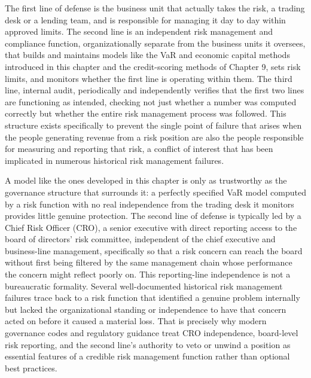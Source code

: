 \documentclass[../ai_in_finance]{subfiles}
\begin{document}
The first line of defense is the business unit that actually takes the risk, a trading desk or a lending team, and is responsible for managing it day to day within approved limits.
The second line is an independent risk management and compliance function, organizationally separate from the business units it oversees, that builds and maintains models like the VaR and economic capital methods introduced in this chapter and the credit-scoring methods of Chapter 9, sets risk limits, and monitors whether the first line is operating within them.
The third line, internal audit, periodically and independently verifies that the first two lines are functioning as intended, checking not just whether a number was computed correctly but whether the entire risk management process was followed. This structure exists specifically to prevent the single point of failure that arises when the people generating revenue from a risk position are also the people responsible for measuring and reporting that risk, a conflict of interest that has been implicated in numerous historical risk management failures.

A model like the ones developed in this chapter is only as trustworthy as the governance structure that surrounds it: a perfectly specified VaR model computed by a risk function with no real independence from the trading desk it monitors provides little genuine protection.
The second line of defense is typically led by a Chief Risk Officer (CRO), a senior executive with direct reporting access to the board of directors' risk committee, independent of the chief executive and business-line management, specifically so that a risk concern can reach the board without first being filtered by the same management chain whose performance the concern might reflect poorly on.
This reporting-line independence is not a bureaucratic formality. Several well-documented historical risk management failures trace back to a risk function that identified a genuine problem internally but lacked the organizational standing or independence to have that concern acted on before it caused a material loss. That is precisely why modern governance codes and regulatory guidance treat CRO independence, board-level risk reporting, and the second line's authority to veto or unwind a position as essential features of a credible risk management function rather than optional best practices.
\end{document}
